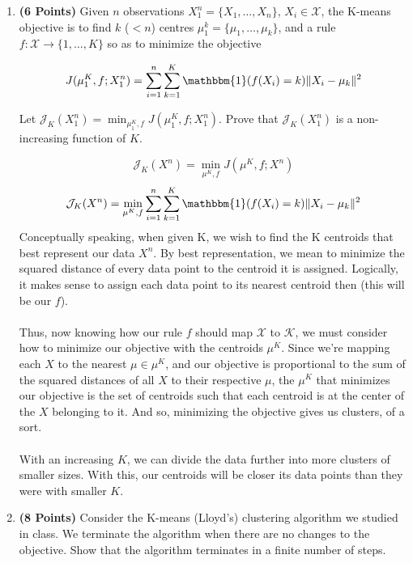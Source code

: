 \documentclass[a4paper]{article}
\newcounter{thm}
\newcommand{\Xcal}{\mathcal{X}}
\newcommand{\Jcal}{\mathcal{J}}
\newcommand{\indfone}{\mathbbm{1}}
\theoremstyle{definition}
\newenvironment{soln}{
	\leavevmode\color{blue}\ignorespaces
}{}
\begin{document}
\begin{enumerate}

\item \textbf{(6 Points)}
Given $n$ observations $X_1^n = \{X_1, \dots, X_n\}$, $X_i \in \Xcal$, the K-means objective
is to find $k$
($<n$) centres $\mu_1^k = \{\mu_1, \dots, \mu_k\}$, and a rule $f:\Xcal \rightarrow
\{1,\dots, K\}$ so as to minimize the objective

\begin{equation}
J(\mu_1^K, f; X_1^n) = \sum_{i=1}^n \sum_{k=1}^K \indfone(f(X_i) = k) \|X_i - \mu_k\|^2
\label{eqn:kmeans}
\end{equation}

Let $\Jcal_K(X_1^n) = \min_{\mu_1^K, f} J(\mu_1^K, f; X_1^n)$. Prove that
$\Jcal_{K}(X_1^n)$ is a non-increasing function of $K$.

\begin{soln}
	$$\Jcal_K(X^n) = \min_{\mu^K, f} J(\mu^K, f; X^n)$$
	$$\Jcal_K(X^n) = \min_{\mu^K, f} \sum_{i=1}^n \sum_{k=1}^K \indfone(f(X_i) = k) \|X_i - \mu_k\|^2$$
	Conceptually speaking, when given K, we wish to find the K centroids that best represent our data $X^n$. By best representation, we mean to minimize the squared distance of every data point to the centroid it is assigned. Logically, it makes sense to assign each data point to its nearest centroid then (this will be our $f$). \\ \\
	Thus, now knowing how our rule $f$ should map $\Xcal$ to $\mathcal{K}$, we must consider how to minimize our objective with the centroids $\mu^K$. Since we're mapping each $X$ to the nearest $\mu \in \mu^K$, and our objective is proportional to the sum of the squared distances of all $X$ to their respective $\mu$, the $\mu^K$ that minimizes our objective is the set of centroids such that each centroid is at the center of the $X$ belonging to it. And so, minimizing the objective gives us clusters, of a sort. \\ \\
	With an increasing $K$, we can divide the data further into more clusters of smaller sizes. With this, our centroids will be closer its data points than they were with smaller $K$.
\end{soln}

\item \textbf{(8 Points)}
Consider the K-means (Lloyd's) clustering algorithm we studied in class. We
terminate the algorithm when there are no changes to the objective.
Show that the algorithm terminates in a finite number of steps.


\end{enumerate}
\end{document}
